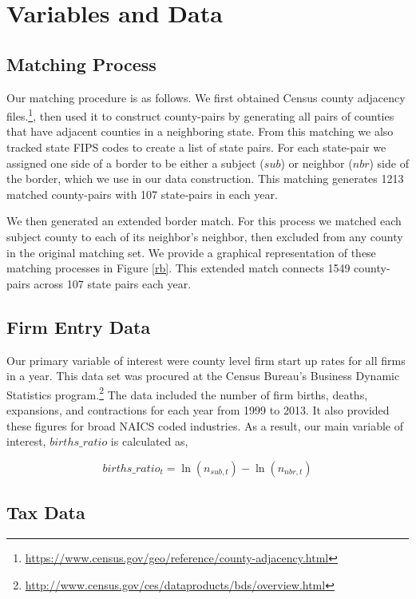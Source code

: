 \section{Variables and Data}

\subsection{Matching Process}

Our matching procedure is as follows. We first obtained Census county adjacency files.\footnote{\url{https://www.census.gov/geo/reference/county-adjacency.html}}, then used it to construct county-pairs by generating all pairs of counties that have adjacent counties in a neighboring state. From this matching we also tracked state FIPS codes to create a list of state pairs. For each state-pair we assigned one side of a border to be either a subject ($sub$) or neighbor ($nbr$) side of the border, which we use in our data construction. This matching generates 1213 matched county-pairs with 107 state-pairs in each year.

We then generated an extended border match. For this process we matched each subject county to each of its neighbor's neighbor, then excluded from any county in the original matching set. We provide a graphical representation of these matching processes in Figure \ref{rb}. This extended match connects 1549 county-pairs across 107 state pairs each year.

\subsection{Firm Entry Data}

Our primary variable of interest were county level firm start up rates for all firms in a year. This data set was procured at the Census Bureau's Business Dynamic Statistics program.\footnote{\url{http://www.census.gov/ces/dataproducts/bds/overview.html}} The data included the number of firm births, deaths, expansions, and contractions for each year from 1999 to 2013. It also provided these figures for  broad NAICS coded industries. As a result, our main variable of interest, $births\_ratio$ is calculated as,

\begin{equation} births\_ratio_{t} = \ln(n_{sub,t})-\ln(n_{nbr,t})\end{equation}

\subsection{Tax Data}


